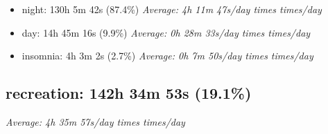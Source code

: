 \documentclass[12pt]{extarticle}
\begin{document}
\begin{itemize}[topsep=0pt, itemsep=-0.5ex]
    \item night: 130h 5m 42s (87.4\%)
        \textit{Average: 4h 11m 47s/day  times  times/day}\par
    \item day: 14h 45m 16s (9.9\%)
        \textit{Average: 0h 28m 33s/day  times  times/day}\par
    \item insomnia: 4h 3m 2s (2.7\%)
        \textit{Average: 0h 7m 50s/day  times  times/day}\par
\end{itemize}
{\fontsize{16}{19.2}\selectfont\subsection*{recreation: 142h 34m 53s (19.1\%)}}
\textit{Average: 4h 35m 57s/day  times  times/day}\par
\end{document}
